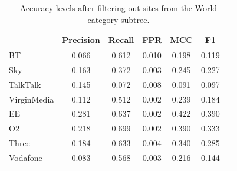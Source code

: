 \documentclass{bmcart}
\begin{document}
\begin{table}[h!]
\caption{Accuracy levels after filtering out sites from the World category subtree.}
  \begin{tabular}{ l c c c c c c}
    \hline
     & Precision & Recall & FPR & MCC & F1 \\
    \hline
	BT & 0.066 & 0.612 & 0.010 & 0.198 & 0.119 \\
    Sky & 0.163 & 0.372 & 0.003 & 0.245 & 0.227 \\
    TalkTalk & 0.145 & 0.072 & 0.008 & 0.091 & 0.097 \\
	VirginMedia & 0.112 & 0.512 & 0.002 & 0.239 & 0.184 \\
	\hline    
	EE & 0.281 & 0.637 & 0.002 & 0.422 & 0.390 \\
	O2 & 0.218 & 0.699 & 0.002 & 0.390 & 0.333 \\
	Three & 0.184 & 0.633 & 0.004 & 0.340 & 0.285 \\
	Vodafone & 0.083 & 0.568 & 0.003 & 0.216 & 0.144 \\
    \hline
  \end{tabular}
\end{table}


\end{document}
